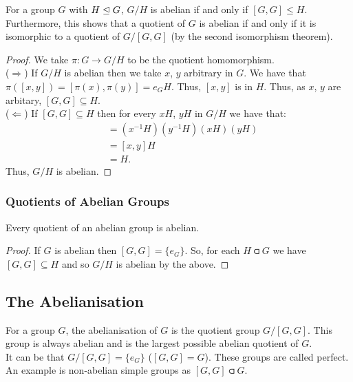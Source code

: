 For a group $G$ with $H \trianglelefteq G$, $G/H$ is abelian if and only if 
$[G, G] \leq H$. Furthermore, this shows that a quotient of $G$
is abelian if and only if it is isomorphic to a quotient of $G/[G, G]$
(by the second isomorphism theorem).

\begin{proof}
    We take $\pi : G \to G/H$ to be the quotient homomorphism.
    \\[\baselineskip]
    ($\Rightarrow$) 
    If $G/H$ is abelian then we take $x$, $y$ arbitrary in $G$. 
    We have that $\pi([x, y]) = [\pi(x), \pi(y)] = e_GH$. 
    Thus, $[x, y]$ is in $H$. 
    Thus, as $x$, $y$ are arbitary, $[G, G] \subseteq H$.
    \\[\baselineskip]
    ($\Leftarrow$)
    If $[G, G] \subseteq H$ then for every $xH$, $yH$ in $G/H$ we have
    that: \begin{align*}
        [xH, yH] &= (x^{-1}H)(y^{-1}H)(xH)(yH) \\
        &= [x, y]H \\
        &= H.
    \end{align*} Thus, $G/H$ is abelian.
\end{proof}

\subsubsection{Quotients of Abelian Groups}

Every quotient of an abelian group is abelian.

\begin{proof}
    If $G$ is abelian then $[G, G] = \{e_G\}$. So, for each $H \csub G$
    we have $[G, G] \subseteq H$ and so $G/H$ is abelian by the above.
\end{proof}

\subsection{The Abelianisation}

For a group $G$, the abelianisation of $G$ is the quotient group 
$G/[G, G]$. This group is always abelian and is the largest possible
abelian quotient of $G$.
\\[\baselineskip]
It can be that $G/[G, G] = \{e_G\}$ ($[G, G] = G$). These groups are
called perfect. An example is non-abelian simple groups as $[G, G] \csub G$.
